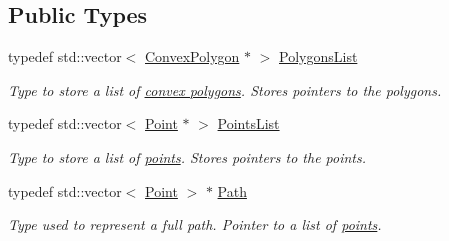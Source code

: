 \subsection*{Public Types}
\begin{DoxyCompactItemize}
\item 
typedef std::vector$<$ \hyperlink{structPathFinder_1_1ConvexPolygon}{ConvexPolygon} $\ast$ $>$ \hyperlink{classPathFinder_a16ed073fa542c82fd09e582cb4fbed24}{PolygonsList}
\begin{DoxyCompactList}\small\item\em Type to store a list of \hyperlink{structPathFinder_1_1ConvexPolygon}{convex polygons}. Stores pointers to the polygons. \item\end{DoxyCompactList}\item 
typedef std::vector$<$ \hyperlink{structPathFinder_1_1Point}{Point} $\ast$ $>$ \hyperlink{classPathFinder_a792a34ce673309f873090141c3d96f1c}{PointsList}
\begin{DoxyCompactList}\small\item\em Type to store a list of \hyperlink{structPathFinder_1_1Point}{points}. Stores pointers to the points. \item\end{DoxyCompactList}\item 
typedef std::vector$<$ \hyperlink{structPathFinder_1_1Point}{Point} $>$ $\ast$ \hyperlink{classPathFinder_a269aba09b7b3208092f67f2bc02cf63e}{Path}
\begin{DoxyCompactList}\small\item\em Type used to represent a full path. Pointer to a list of \hyperlink{structPathFinder_1_1Point}{points}. \item\end{DoxyCompactList}\end{DoxyCompactItemize}
